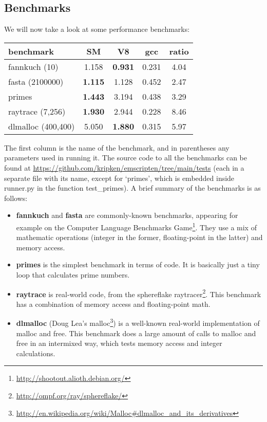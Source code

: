 \documentclass[preprint,10pt]{sigplanconf}
\begin{document}
\subsection{Benchmarks}
\label{sec:benchmarks}

We will now take a look at some performance benchmarks:

\bigskip

\begin{tabular}{ l | c | c | c || c }
  \hline
  \textbf{benchmark} & \textbf{SM}    & \textbf{V8}    & \textbf{gcc} & \textbf{ratio} \\
  \hline
  fannkuch (10)      & 1.158          & \textbf{0.931} & 0.231       &  4.04 \\
  fasta (2100000)    & \textbf{1.115} & 1.128          & 0.452       &  2.47 \\
  primes             & \textbf{1.443} & 3.194          & 0.438       &  3.29 \\
  raytrace (7,256)   & \textbf{1.930} & 2.944          & 0.228       &  8.46 \\
  dlmalloc (400,400) & 5.050          & \textbf{1.880} & 0.315       &  5.97 \\
  \hline
\end{tabular}

\bigskip

The first column is the name of the benchmark, and in parentheses any
parameters used in running it. The source code to all the benchmarks
can be found at \url{https://github.com/kripken/emscripten/tree/main/tests}
(each in a separate file with its name, except for `primes', which is
embedded inside runner.py in the function test\_primes). A brief summary of
the benchmarks is as follows:
\begin{itemize}
\item \textbf{fannkuch} and \textbf{fasta} are commonly-known benchmarks, appearing for example
      on the Computer Language Benchmarks Game\footnote{\url{http://shootout.alioth.debian.org/}}.
      They use a mix of mathematic operations (integer in the former, floating-point in the latter) and memory access.
\item \textbf{primes} is the simplest benchmark in terms of code. It is basically just a tiny loop that calculates prime numbers.
\item \textbf{raytrace} is real-world code, from the sphereflake raytracer\footnote{\url{http://ompf.org/ray/sphereflake/}}. This benchmark has a combination of memory access and floating-point math.
\item \textbf{dlmalloc} (Doug Lea's malloc\footnote{\url{http://en.wikipedia.org/wiki/Malloc#dlmalloc_and_its_derivatives}}) is a well-known real-world implementation of malloc and free. This benchmark does a large amount of calls to malloc and free in an intermixed way, which tests memory access and integer calculations. 
\end{itemize}
\end{document}
